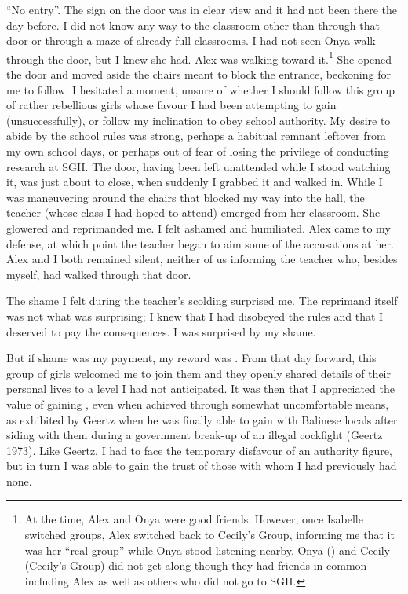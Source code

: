 ``No entry''. The sign on the door was in clear view and it had not been there the day before. I did not know any way to the classroom other than through that door or through a maze of already-full classrooms. I had not seen Onya walk through the door, but I knew she had. Alex was walking toward it.\footnote{At the time, Alex and Onya were good friends. However, once Isabelle switched groups, Alex switched back to Cecily's Group, informing me that it was her ``real group'' while Onya stood listening nearby. Onya () and Cecily (Cecily's Group) did not get along though they had friends in common including Alex as well as others who did not go to SGH.}  She opened the door and moved aside the chairs meant to block the entrance, beckoning for me to follow. I hesitated a moment, unsure of whether I should follow this group of rather rebellious girls whose favour I had been attempting to gain (unsuccessfully), or follow my inclination to obey school authority. My desire to abide by the school rules was strong, perhaps a habitual remnant leftover from my own school days, or perhaps out of fear of losing the privilege of conducting research at SGH. The door, having been left unattended while I stood watching it, was just about to close, when suddenly I grabbed it and walked in. While I was maneuvering around the chairs that blocked my way into the hall, the teacher (whose class I had hoped to attend) emerged from her classroom. She glowered and reprimanded me. I felt ashamed and humiliated. Alex came to my defense, at which point the teacher began to aim some of the accusations at her. Alex and I both remained silent, neither of us informing the teacher who, besides myself, had walked through that door.

The shame I felt during the teacher's scolding surprised me. The reprimand itself was not what was surprising; I knew that I had disobeyed the rules and that I deserved to pay the consequences. I was surprised by my shame. 

But if shame was my payment, my reward was . From that day forward, this group of girls welcomed me to join them and they openly shared details of their personal lives to a level I had not anticipated. It was then that I appreciated the value of gaining , even when achieved through somewhat uncomfortable means, as exhibited by Geertz when he was finally able to gain  with Balinese locals after siding with them during a government break-up of an illegal cockfight (Geertz 1973). Like Geertz, I had to face the temporary disfavour of an authority figure, but in turn I was able to gain the trust of those with whom I had previously had none. 

